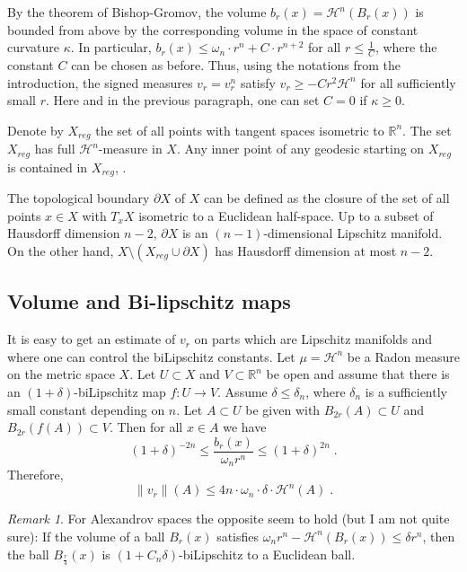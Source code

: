 \documentclass[12pt,leqno]{amsart}
\numberwithin{equation}{section}
\theoremstyle{definition}
\theoremstyle{remark}
\newtheorem{rem}[thm]{Remark}
\newcommand{\R}{\mathbb{R}}
\def\:{\colon}
\begin{document}
By the theorem of Bishop-Gromov, the volume $b_r (x)=\mathcal H^n (B_r(x))$ is bounded from above by the corresponding volume in the
space of constant curvature $\kappa$. In particular, $b_r (x) \leq \omega _n \cdot r^n + C \cdot r^{n+2}$ for all $r\leq \frac 1 C$, where
the constant $C$ can be chosen as before.  Thus, using the notations from the introduction, the signed measures $v_r  =v_r^n $ satisfy
$v_r \geq -Cr^2 \mathcal H^n$  for all sufficiently small $r$.
 Here and in the previous paragraph,  one can set $C=0$ if $\kappa \geq 0$.


Denote by $X_{reg}$ the set of all points with tangent spaces isometric to $\R^n$.  The set $X_{reg}$ has full $\mathcal H^n$-measure in $X$.
Any inner point of any geodesic starting on $X_{reg}$ is contained in $X_{reg}$, \cite{Petparallel}.


The topological boundary $\partial X$ of $X$ can be defined as the closure of the  set of all points $x\in X$ with $T_xX$ isometric to a Euclidean half-space. Up to a subset of Hausdorff dimension $n-2$, $\partial X$ is an $(n-1)$-dimensional Lipschitz manifold. On the other hand, $X\setminus (X_{reg} \cup \partial X)$ has Hausdorff dimension at most $n-2$.


\subsection{Volume and Bi-lipschitz maps}
It is easy to get an estimate of $v_r$  on parts which are Lipschitz manifolds and where one can control the biLipschitz constants.
Let $\mu =\mathcal H^n$ be a Radon measure on the metric space $X$.
Let $U\subset X$ and $V\subset \R^n$ be open and assume that there is an $(1+\delta)$-biLipschitz map
$f\:U \to V$.  Assume $\delta  \leq \delta _n$, where $\delta_n$ is a sufficiently small constant depending on $n$.
 Let $A\subset U$ be given with
$B_{2r} (A) \subset U$ and $B_{2r} (f(A)) \subset V$.  Then for all $x\in A$ we have
$$(1+\delta)  ^{-2n} \leq \frac {b_r(x)} {\omega _n r^n} \leq (1+\delta ) ^{2n} \; .$$
Therefore,
$$\|v_r \| (A) \leq  4 n \cdot \omega _n \cdot  \delta \cdot \mathcal H^n (A)  \; .$$
\begin{rem} For Alexandrov  spaces the opposite seem to hold (but I am not quite sure):
If the volume of  a ball $B_r (x)$ satisfies $\omega _n r^n -\mathcal H^n (B_r (x)) \leq \delta r ^n$, then
the ball $B_{\frac r 4} (x)$ is  $(1+C_n \delta )$-biLipschitz  to a Euclidean ball.
\end{rem}
\end{document}
